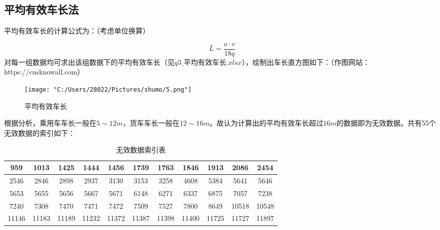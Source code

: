 \documentclass[withoutpreface,bwprint]{cumcmthesis} %
\begin{document}
    \subsection{平均有效车长法}
    平均有效车长的计算公式为：（考虑单位换算）\par
    \begin{equation}
        \bar{L}=\frac{o\cdot v}{18q}
    \end{equation}
    对每一组数据均可求出该组数据下的平均有效车长（见$q3\_\text{平均有效车长}.xlsx$），绘制出车长直方图如下：（作图网站：https://cnsknowall.com）\par
    \begin{figure}[!htbp] 
        \centering
        \texttt{[image: "C:/Users/28022/Pictures/shumo/5.png"]}
        \caption{平均有效车长}
        \label{fig:your_label}
    \end{figure}\par
    根据分析，乘用车车长一般在$5\sim 12m$，货车车长一般在$12\sim 16m$。故认为计算出的平均有效车长超过$16m$的数据即为无效数据。共有55个
    无效数据的索引如下：\par
        \begin{table}[!htbp]
            \centering
            \caption{无效数据索引表}
            \begin{tabular}{|c|c|c|c|c|c|c|c|c|c|c|}
                \hline
                959 & 1013 & 1425 & 1444 & 1456 & 1739 & 1763 & 1846 & 1913 & 2086 & 2454 \\ \hline
                2546 & 2846 & 2898 & 2937 & 3130 & 3153 & 3258 & 4608 & 5384 & 5641 & 5646 \\ \hline
                5653 & 5655 & 5656 & 5667 & 5671 & 6148 & 6271 & 6337 & 6875 & 7057 & 7238 \\ \hline
                7240 & 7308 & 7470 & 7471 & 7472 & 7509 & 7527 & 7800 & 8649 & 10518 & 10548 \\ \hline
                11146 & 11183 & 11189 & 11232 & 11372 & 11387 & 11398 & 11400 & 11725 & 11727 & 11897 \\ \hline
                \end{tabular}
        \end{table}\par
\end{document}
